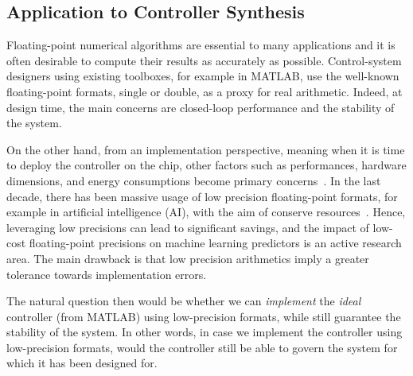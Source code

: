 \subsection{Application to Controller Synthesis}
\label{controllers}
%
Floating-point numerical algorithms are essential to many applications and it is often desirable to compute their results as accurately as possible.
%
Control-system designers using existing toolboxes, for example in MATLAB, use the well-known floating-point formats, single or double, as a proxy for real arithmetic. 
%
Indeed, at design time, the main concerns are closed-loop performance and the stability of the system.
%

%
%
On the other hand, from an implementation perspective, meaning when it is time to deploy the controller on the chip, other factors such as performances, hardware dimensions, and energy consumptions become primary concerns~\cite{suardi}.
%
In the last decade, there has been massive usage of low precision floating-point formats, for example in artificial intelligence (AI), with the aim of conserve resources~\cite{fppower}.
%
Hence, leveraging low precisions can lead to significant savings, and the impact of low-cost floating-point precisions on machine learning predictors is an active research area.
%
The main drawback is that low precision arithmetics imply a greater tolerance towards implementation errors.
%

The natural question then would be whether we can \emph{implement} the \emph{ideal} controller (from MATLAB) using low-precision formats, while still guarantee the stability of the system.
%
In other words, in case we implement the controller using low-precision formats, would the controller still be able to govern the system for which it has been designed for.
%

